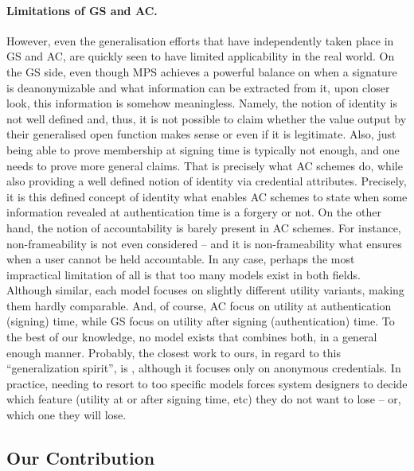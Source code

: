 \paragraph{Limitations of GS and AC.} %
However, even the generalisation efforts that have independently taken place in
GS and AC, are quickly seen to have limited applicability in the real world. On
the GS side, even though MPS achieves a powerful balance on when a signature is
deanonymizable and what information can be extracted from it, upon closer look,
this information is somehow meaningless. Namely, the notion of identity is not
well defined and, thus, it is not possible to claim whether the value output by
their generalised open function makes sense or even if it is legitimate. Also,
just being able to prove membership at signing time is typically not enough, and
one needs to prove more general claims. That is precisely what AC schemes do,
while also providing a well defined notion of identity via credential
attributes. Precisely, it is this defined concept of identity what enables AC
schemes to state when some information revealed at authentication time is a
forgery or not. On the other hand, the notion of accountability  is barely
present in AC schemes. For instance, non-frameability is not even considered
-- and it is non-frameability what ensures when a user cannot be held
accountable.
%
In any case, perhaps the most impractical limitation of all is that too many
models exist in both fields. Although similar, each model focuses on slightly
different utility variants, making them hardly comparable. And, of course, AC
focus on utility at authentication (signing) time, while GS focus on
utility after signing (authentication) time. To the best of our knowledge, no
model exists that combines both, in a general enough manner. Probably, the
closest work to ours, in regard to this ``generalization spirit'', is
\cite{ckl+15}, although it focuses only on anonymous credentials. In practice,
needing to resort to too specific models forces system designers to decide which
feature (utility at or after signing time, etc) they do not want to lose -- or,
which one they will lose.

\subsection{Our Contribution} 

